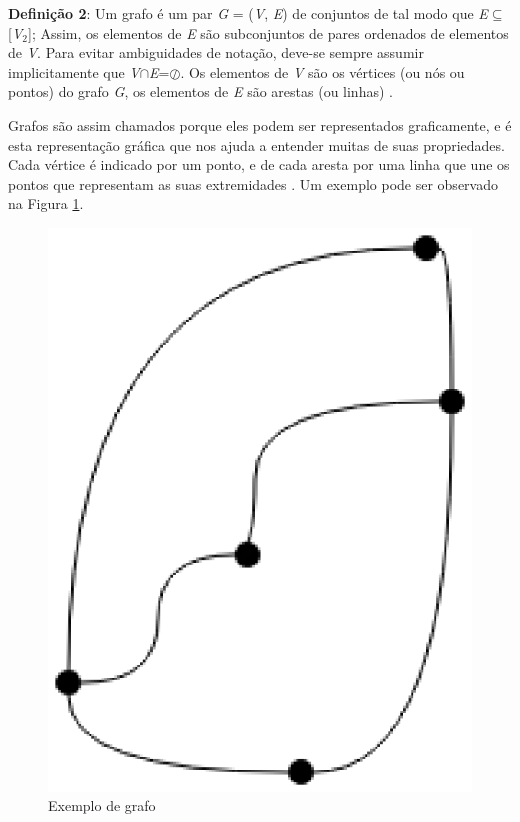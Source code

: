 \textbf{Definição 2}: Um grafo é um par \textit{G} = (\textit{V}, \textit{E}) de conjuntos de tal modo que \textit{E}$\subseteq$[\textit{V}$_2$]; Assim, os elementos de \textit{E} são subconjuntos de pares ordenados de elementos de \textit{V}. Para evitar ambiguidades de notação, deve-se sempre assumir implicitamente que \textit{V}$\cap$\textit{E}=$\oslash$. Os elementos de \textit{V} são os vértices (ou nós ou pontos) do grafo \textit{G}, os elementos de \textit{E} são arestas (ou linhas) \cite{Diestel:1997}.

Grafos são assim chamados porque eles podem ser representados graficamente, e é esta representação gráfica que nos ajuda a entender muitas de suas propriedades. Cada vértice é indicado por um ponto, e de cada aresta por uma linha que une os pontos que representam as suas extremidades \cite{Bondy:2007}. Um exemplo pode ser observado na Figura \ref{exemplo_grafo}.

\begin{figure}[!h]
	\centering
	\includegraphics[scale=0.3]{figuras/capitulo2/exemplo_grafo.eps}
	\caption{Exemplo de grafo}
	\label{exemplo_grafo}
\end{figure}

